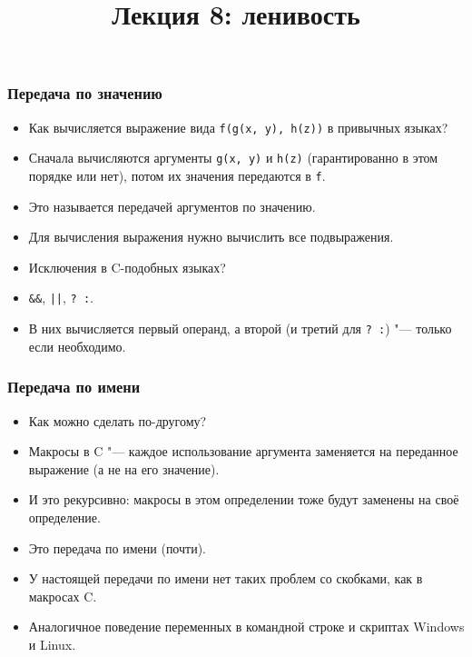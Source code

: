 \documentclass[11pt]{beamer}
\title{Лекция 8: ленивость}
\begin{document}
\begin{frame}[plain]
  \maketitle
\end{frame}

\begin{frame}[fragile]
  \frametitle{Передача по значению}
  \begin{itemize}
    \item Как вычисляется выражение вида \lstinline|f(g(x, y), h(z))| в привычных языках?
          \pause
    \item Сначала вычисляются аргументы \lstinline|g(x, y)| и \lstinline|h(z)| (гарантированно в этом порядке или нет), потом их значения передаются в \lstinline|f|.
    \item Это называется передачей аргументов по значению.
    \item Для вычисления выражения нужно вычислить все подвыражения.
    \item Исключения в C-подобных языках?
          \pause
    \item \lstinline|&&|, \lstinline{||}, \lstinline|? :|.
          \pause
    \item В них вычисляется первый операнд, а второй (и третий для \lstinline|? :|) "--- только если необходимо.
  \end{itemize}
\end{frame}

\begin{frame}[fragile]
  \frametitle{Передача по имени}
  \begin{itemize}
    \item Как можно сделать по-другому?
          \pause
    \item Макросы в C "--- каждое использование аргумента заменяется на переданное выражение (а не на его значение).
    \item И это рекурсивно: макросы в этом определении тоже будут заменены на своё определение.
    \item Это передача по имени (почти).
          \pause
    \item У настоящей передачи по имени нет таких проблем со скобками, как в макросах C.
          \pause
    \item Аналогичное поведение переменных в командной строке и скриптах Windows и Linux.
  \end{itemize}
\end{frame}
\end{document}
